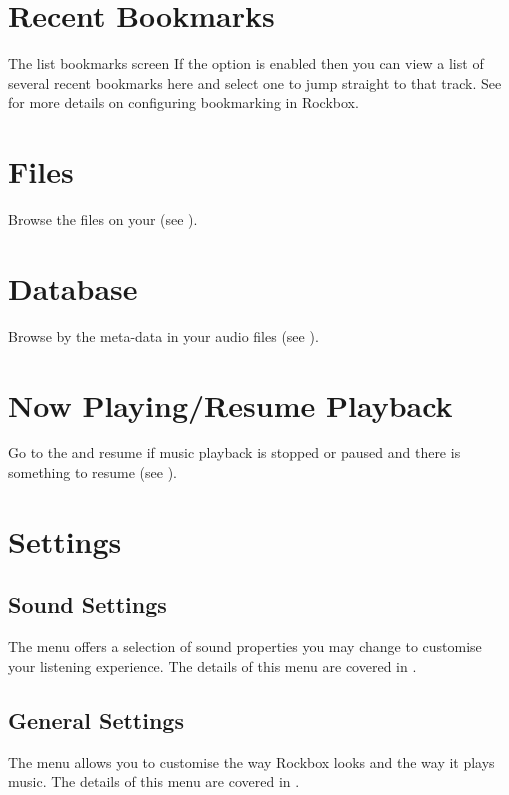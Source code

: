 \section {Recent Bookmarks}
%
  {The list bookmarks screen}{}
If the  option is enabled 
then you can view a list of several recent bookmarks here and select one to 
jump straight to that track. See  
for more details on configuring bookmarking in Rockbox.

\section{Files}
Browse the files on your \dap{} (see ).

\section{Database}
Browse by the meta-data in your audio files (see ).

\section{Now Playing/Resume Playback}
Go to the  and resume if music playback is
stopped or paused and there is something to resume (see ).

\section{Settings}
\subsection{Sound Settings}
The  menu offers a selection of sound properties you may 
change to customise your listening experience. The details of this menu are covered
in .

\subsection{General Settings}
The  menu allows you to customise the way Rockbox looks 
and the way it plays music. The details of this menu are covered in
.

